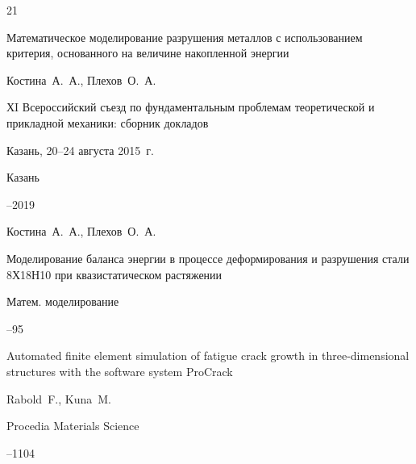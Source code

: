 \begin{thebibliography}{21}

\paper Математическое моделирование разрушения металлов с использованием критерия, основанного на величине накопленной энергии

\by Костина~А.~А., Плехов~О.~А.

\inbook ХI Всероссийский съезд по фундаментальным проблемам теоретической и прикладной механики: сборник докладов

\procinfo Казань, 20--24 августа 2015~г.

\publaddr Казань


--2019




\by Костина~А.~А., Плехов~О.~А.

\paper Моделирование баланса энергии в процессе деформирования и разрушения стали 8Х18Н10 при квазистатическом растяжении

\jour Матем. моделирование




--95






\paper Automated finite element simulation of fatigue crack growth in three-dimensional structures with the software system ProCrack

\by Rabold~F., Kuna~M.

\jour Procedia Materials Science



--1104




\end{thebibliography}



\RuDate





\newpage








